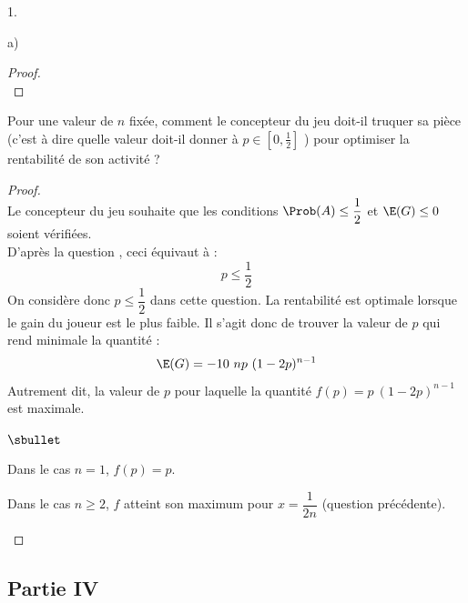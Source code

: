 \documentclass[11pt]{article}%
\begin{document}
\begin{noliste}{1.}
\begin{noliste}{a)}
\begin{proof}


    ~\\[-1.4cm]
  \end{proof}

  \item Pour une valeur de $n$ fixée, comment le concepteur du jeu
    doit-il truquer sa pièce (c'est à dire quelle valeur doit-il
    donner à $p \in \left[0, \frac{1}{2} \right]$ ) pour optimiser la
    rentabilité de son activité ?

    \begin{proof}~\\%
      Le concepteur du jeu souhaite que les conditions $\Prob(A) \leq
      \dfrac{1}{2}$ et $\E(G) \leq 0$ soient vérifiées.\\
      D'après la question , ceci équivaut à :
      \[
      p \leq \dfrac{1}{2}
      \]
      On considère donc $p \leq \dfrac{1}{2}$ dans cette question. La
      rentabilité est optimale lorsque le gain du joueur est le plus
      faible. Il s'agit donc de trouver la valeur de $p$ qui rend
      minimale la quantité : 
      \[
      \E(G) = -10 \ np \ (1-2p)^{n-1}
      \]
      Autrement dit, la valeur de $p$ pour laquelle la quantité $f(p)
      = p \ (1-2p)^{n-1}$ est maximale.
      \begin{noliste}{$\sbullet$}
      \item Dans le cas $n = 1$, $f(p) = p$. %
        
      \item Dans le cas $n \geq 2$, $f$ atteint son maximum pour $x =
        \dfrac{1}{2n}$ (\cf question précédente). %
        ~\\[-1.2cm]
      \end{noliste}
    \end{proof}
  \end{noliste}
\end{noliste}




\subsection*{Partie IV}
\end{document}
